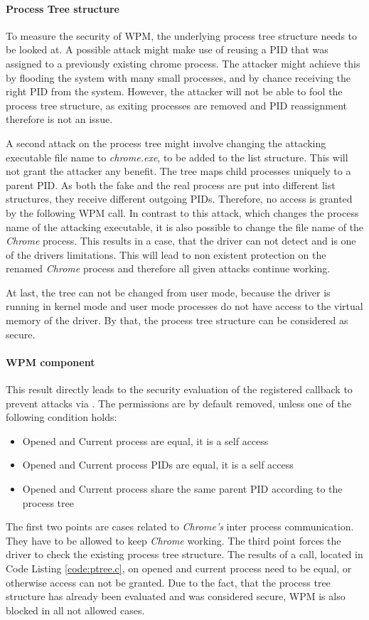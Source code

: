 \paragraph{Process Tree structure}
To measure the security of \gls{WPM}, the underlying process tree structure needs to be looked at.
A possible attack might make use of reusing a \gls{PID} that was assigned to a previously existing chrome process. The attacker might achieve this by flooding the system with many small processes, and by chance receiving the right \gls{PID} from the system. However, the attacker will not be able to fool the process tree structure, as exiting processes are removed and \gls{PID} reassignment therefore is not an issue. 

A second attack on the process tree might involve changing the attacking executable file name to \emph{chrome.exe}, to be added to the list structure. This will not grant the attacker any benefit. The tree maps child processes uniquely to a parent \gls{PID}. As both the fake and the real process are put into different list structures, they receive different outgoing \glspl{PID}. Therefore, no access is granted by the following \gls{WPM} call. In contrast to this attack, which changes the process name of the attacking executable, it is also possible to change the file name of the \emph{Chrome} process. This results in a case, that the driver can not detect and is one of the drivers limitations. This will lead to non existent protection on the renamed \emph{Chrome} process and therefore all given attacks continue working.

At last, the tree can not be changed from user mode, because the driver is running in kernel mode and user mode processes do not have access to the virtual memory of the driver. By that, the process tree structure can be considered as secure.

\paragraph{WPM component}
This result directly leads to the security evaluation of the registered callback to prevent attacks via . The permissions are by default removed, unless one of the following condition holds:
\begin{itemize}
\item Opened and Current process are equal, it is a self access
\item Opened and Current process \glspl{PID} are equal, it is a self access
\item Opened and Current process share the same parent \gls{PID} according to the process tree
\end{itemize}
The first two points are cases related to \emph{Chrome's} inter process communication. They have to be allowed to keep \emph{Chrome} working. The third point forces the driver to check the existing process tree structure. The results of a  call, located in Code Listing \ref{code:ptree.c}, on opened and current process need to be equal, or otherwise access can not be granted. Due to the fact, that the process tree structure has already been evaluated and was considered secure, \gls{WPM} is also blocked in all not allowed cases. 

